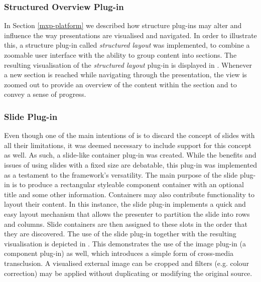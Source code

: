     \subsubsection{Structured Overview Plug-in}

     In Section \ref{mxp-platform} we described how structure plug-ins may
     alter and influence the way presentations are visualised and navigated. In
     order to illustrate this, a structure plug-in called \emph{structured
     layout} was implemented, to combine a zoomable user interface with the
     ability to group content into sections. The resulting visualisation of the
     \emph{structured layout} plug-in is displayed in .
     Whenever a new section is reached while navigating through the
     presentation, the view is zoomed out to provide an overview of the content
     within the section and to convey a sense of progress.

    \subsubsection{Slide Plug-in}

     Even though one of the main intentions of \mxp is to discard the concept
     of slides with all their limitations, it was deemed necessary to include
     support for this concept as well. As such, a slide-like container plug-in
     was created. While the benefits and issues of using slides with a fixed
     size are debatable, this plug-in was implemented as a testament to the
     framework's versatility. The main purpose of the slide plug-in is to
     produce a rectangular styleable component container with an optional title
     and some other information. Containers may also contribute functionality
     to layout their content. In this instance, the slide plug-in implements a
     quick and easy layout mechanism that allows the presenter to partition the
     slide into rows and columns. Slide containers are then assigned to these
     slots in the order that they are discovered. The use of the slide plug-in
     together with the resulting visualisation is depicted in
     . This demonstrates the use of the image plug-in (a
     component plug-in) as well, which introduces a simple form of cross-media
     transclusion. A visualised external image can be cropped and filters (e.g.
     colour correction) may be applied without duplicating or modifying the
     original source.

